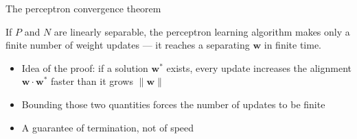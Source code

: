 \documentclass[aspectratio=169, 11pt]{beamer}
\newcommand{\mppar}[2]{%
  \vfill
  {\footnotesize
  \begin{tcolorbox}[enhanced, sidebyside, sidebyside align=top,
                    lefthand ratio=0.485,
                    segmentation style={shc!35, line width=0.6pt},
                    colback=shc!5, colframe=shc!35, boxrule=0.5pt,
                    arc=1.5mm, left=2mm, right=2mm, top=0.8mm, bottom=0.8mm]
    {\color{shc}\textbf{M--P}}\;\; #1
  \tcblower
    {\color{dpc}\textbf{PERCEPTRON}}\;\; #2
  \end{tcolorbox}}%
  \vspace{0.6em}%
}
\newcommand{\figsource}[1]{{\scriptsize\color{mcMuted} #1}}
\newcommand{\src}[3]{}      %
\begin{document}
\begin{frame}{The perceptron convergence theorem}
  \src{rojas1996}{section}{4.2.2}
  \begin{redhighlight}
    If $P$ and $N$ are \alert{linearly separable}, the
    perceptron learning algorithm makes only a \alert{finite}
    number of weight updates --- it reaches a separating
    $\mathbf{w}$ in finite time.
    
  \end{redhighlight}
  \vspace{0.4em}
  \begin{itemize}\setlength{\itemsep}{2pt}
    \item Idea of the proof: if a solution $\mathbf{w}^{*}$
          exists, every update increases the alignment
          $\mathbf{w}\!\cdot\!\mathbf{w}^{*}$ faster than it
          grows $\lVert\mathbf{w}\rVert$
    \item Bounding those two quantities forces the number of
          updates to be finite
    \item A guarantee of \alert{termination}, not of speed
  \end{itemize}
\end{frame}

\end{document}
